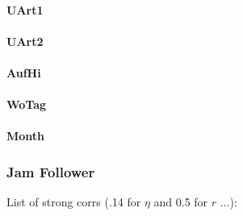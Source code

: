 \documentclass[a4paper,headsepline,footsepline,fontsize=11pt,BCOR=12mm,DIV=12]{report}
\begin{document}
\paragraph{UArt1}

\paragraph{UArt2}

\paragraph{AufHi}

\paragraph{WoTag}

\paragraph{Month}

\subsubsection{Jam Follower}

List of strong corrs (.14 for $\eta$ and 0.5 for $r$ ...):
\end{document}
